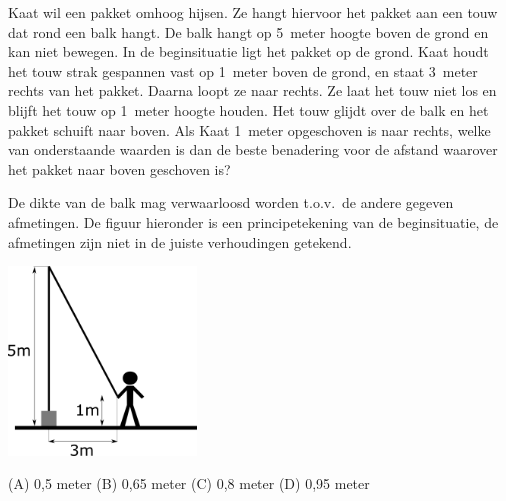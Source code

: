 \documentclass{ximera}
\begin{document}
	
	Kaat wil een pakket omhoog hijsen.  Ze hangt hiervoor het pakket aan een touw dat rond een balk hangt.  De balk hangt op 5~meter hoogte boven de grond en kan niet bewegen.  In de beginsituatie ligt het pakket op de grond. Kaat houdt het touw strak gespannen vast op 1~meter boven de grond, en staat 3~meter rechts van het pakket.  Daarna loopt ze naar rechts. Ze laat het touw niet los en blijft het touw op 1~meter hoogte houden. Het touw glijdt over de balk en het pakket schuift naar boven.  Als Kaat 1~meter opgeschoven is naar rechts, welke van onderstaande waarden is dan de beste benadering voor de afstand waarover het pakket naar boven geschoven is?
	
	De dikte van de balk mag verwaarloosd worden t.o.v.\ de andere gegeven afmetingen. De figuur hieronder is een principetekening van de beginsituatie, de afmetingen zijn niet in de juiste verhoudingen getekend.
	
	\includegraphics[width=5cm]{pakket.png}
	
	\vspace{3mm}
	
	(A) 0,5 meter \hspace{1cm}
	(B) 0,65 meter \hspace{1cm}
	(C) 0,8 meter \hspace{1cm}
	(D) 0,95 meter
	
%	
%	

\end{document}

